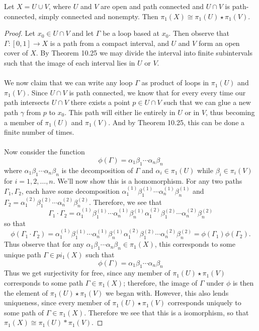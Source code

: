 \documentclass[a4paper,12pt,twoside]{hmcpset}
\begin{document}
\begin{problem}[Theorem 13.40]
    Let \(X = U \cup V\), where \(U\) and \(V\) are open and path
    connected and \(U \cap V\) is path-connected, simply connected and
    nonempty. Then \(\pi_1(X) \cong \pi_1(U) \star \pi_1(V).\)
\end{problem}

\begin{proof}
    Let $x_0 \in U \cap V$ and let $\Gamma$ be a loop based at $x_0$.
    Then observe that $\Gamma: [0, 1] \to X$ is a path from a compact
    interval, and $U$ and $V$ form an open cover of $X$.
    By Theorem 10.25 we may divide the interval into
    finite subintervals such that the image of each interval lies in
    $U$ or $V$. 
    \\
    \\
    We now claim that we can write any loop $\Gamma$ as product of
    loops in $\pi_1(U)$ and $\pi_1(V)$. Since $U \cap V$ is path
    connected, we know that for every every time our path intersects
    $U \cap V$ there exists a point $p \in U \cap V$ such that we can
    glue a new path $\gamma$ from $p$ to $x_0$. This path will either
    lie entirely in $U$ or in $V$, thus becoming a member of
    $\pi_1(U)$ and $\pi_1(V)$. And by Theorem 10.25, this can be done
    a finite number of times. 
    \\
    \\
    Now consider the function 
    \[
        \phi(\Gamma) = \alpha_1\beta_1 \cdots \alpha_n\beta_n
    \]
    where $\alpha_1\beta_1 \cdots \alpha_n\beta_n$ is the
    decomposition of $\Gamma$ and $\alpha_i \in \pi_1(U)$ while
    $\beta_i \in \pi_i(V)$ for $i = 1, 2, \dots, n.$ We'll now show
    this is a homomorphism. For any two paths $\Gamma_1, \Gamma_2$,
    each have some decomposition $\alpha_1^{(1)}\beta_1^{(1)} \cdots
    \alpha_n^{(1)}\beta_n^{(1)}$ and $\Gamma_2 = \alpha_1^{(2)}\beta_1^{(2)} \cdots
    \alpha_n^{(2)}\beta_n^{(2)}$. Therefore, we see that 
    \[
        \Gamma_1 \cdot \Gamma_2 = \alpha_1^{(1)}\beta_1^{(1)} \cdots
        \alpha_n^{(1)}\beta_n^{(1)}\alpha_1^{(2)}\beta_1^{(2)} \cdots
        \alpha_n^{(2)}\beta_n^{(2)}
    \]
    so that 
    \[
        \phi(\Gamma_1 \cdot \Gamma_2) = \alpha_1^{(1)}\beta_1^{(1)} \cdots
        \alpha_n^{(1)}\beta_n^{(1)}\alpha_1^{(2)}\beta_1^{(2)} \cdots
        \alpha_n^{(2)}\beta_n^{(2)}
        = \phi(\Gamma_1)\phi(\Gamma_2).
    \]
    Thus observe that for any $\alpha_1\beta_1 \cdots
    \alpha_n\beta_n\in \pi_1(X)$, this corresponds to some unique path
    $\Gamma \in pi_1(X)$ such that 
    \[
        \phi(\Gamma) = \alpha_1\beta_1 \cdots
        \alpha_n\beta_n
    \]
    Thus we get surjectivity for free, since any member of
    $\pi_1(U)\star \pi_1(V)$ corresponds to some path $\Gamma \in
    \pi_1(X)$; therefore, the image of $\Gamma$ under $\phi$ is then
    the element of $\pi_1(U)\star \pi_1(V)$ we began with. However,
    this also lends uniqueness, since every member of $\pi_1(U)\star
    \pi_1(V)$ corresponds uniquely to some path of $\Gamma \in
    \pi_1(X)$. Therefore we see that this is a isomorphism, so that
    $\pi_1(X) \cong \pi_1(U)*\pi_1(V)$.
\end{proof}
\end{document}
